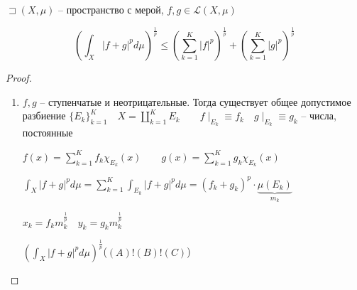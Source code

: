 \begin{theorem}
    $\sqsupset (X, \mu)$ -- пространство с мерой, $f, g\in \mathcal L(X, \mu)$

    \[\left( \int_X |f+g|^pd\mu \right) ^{\frac{1}{p}} \leqslant \left( \sum_{k=1}^{K} |f|^p \right)^{\frac{1}{p}} + \left( \sum_{k=1}^{K} |g|^p \right)^{\frac{1}{p}}\]
\end{theorem}
\begin{proof}
    \begin{enumerate}
        \item $f,g$ -- ступенчатые и неотрицательные. Тогда существует общее допустимое разбиение $\{E_k\}_{k=1}^K\quad X = \coprod_{k=1}^KE_k\qquad f\mid_{E_k} \equiv f_k\quad g\mid_{E_k}\equiv g_k$ -- числа, постоянные

        $f(x) = \sum_{k=1}^{K} f_k \chi_{E_k}(x)\qquad g(x) = \sum_{k=1}^{K} g_k\chi_{E_k}(x)$

        $\int_X |f+g|^pd\mu = \sum_{k=1}^{K} \int_{E_k}|f + g|^pd\mu = (f_k + g_k)^p \cdot \underbrace{\mu(E_k)}_{m_k}$

        $x_k = f_k m_k^{\frac{1}{p}}\quad y_k = g_k m_k^{\frac{1}{p}}$

        $\left(\int_X |f+g|^pd\mu  \right)^{\frac{1}{p}}$($ (A)!(B)!(C) $)
    \end{enumerate}
\end{proof}


